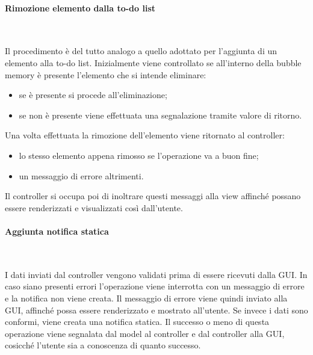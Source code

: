 \begin{samepage}
	\paragraph{Rimozione elemento dalla to-do list}\mbox{}\\
\end{samepage}
Il procedimento è del tutto analogo a quello adottato per l'aggiunta di un elemento alla to-do list. Inizialmente viene controllato se all'interno della bubble memory è presente l'elemento che si intende eliminare: 
\begin{itemize}
	\item se è presente si procede all'eliminazione;
	\item se non è presente viene effettuata una segnalazione tramite valore di ritorno.
\end{itemize}
Una volta effettuata la rimozione dell'elemento viene ritornato al controller:
\begin{itemize}
	\item lo stesso elemento appena rimosso se l'operazione va a buon fine;
	\item un messaggio di errore altrimenti.
\end{itemize}
Il controller si occupa poi di inoltrare questi messaggi alla view affinché possano essere renderizzati e visualizzati così dall'utente.

\begin{samepage}
	\paragraph{Aggiunta notifica statica}\mbox{}\\
\end{samepage}
I dati inviati dal controller vengono validati prima di essere ricevuti dalla GUI. In caso siano presenti errori l'operazione viene interrotta con un messaggio di errore e la notifica non viene creata. Il messaggio di errore viene quindi inviato alla GUI, affinché possa essere renderizzato e mostrato all'utente. Se invece i dati sono conformi, viene creata una notifica statica. Il successo o meno di questa operazione viene segnalata dal model al controller e dal controller alla GUI, cosicché l'utente sia a conoscenza di quanto successo.

